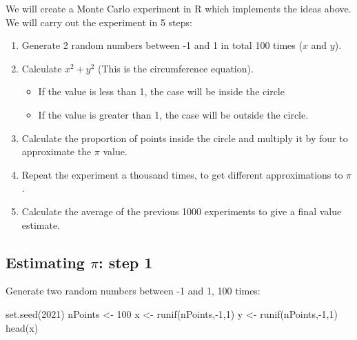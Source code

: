 \documentclass[
]{book}
\newenvironment{Shaded}{\begin{snugshade}}{\end{snugshade}}
\newcommand{\DecValTok}[1]{\textcolor[rgb]{0.00,0.00,0.81}{#1}}
\newcommand{\FunctionTok}[1]{\textcolor[rgb]{0.00,0.00,0.00}{#1}}
\newcommand{\NormalTok}[1]{#1}
\newcommand{\OtherTok}[1]{\textcolor[rgb]{0.56,0.35,0.01}{#1}}
\newcommand{\SpecialCharTok}[1]{\textcolor[rgb]{0.00,0.00,0.00}{#1}}
\providecommand{\tightlist}{%
  \setlength{\itemsep}{0pt}\setlength{\parskip}{0pt}}
\theoremstyle{definition}
\theoremstyle{definition}
\theoremstyle{definition}
\theoremstyle{definition}
\theoremstyle{remark}
\begin{document}
We will create a Monte Carlo experiment in R which implements the ideas above. We will carry out the experiment in 5 steps:

\begin{enumerate}
\def\labelenumi{\arabic{enumi}.}
\item
  Generate 2 random numbers between -1 and 1 in total 100 times (\(x\) and \(y\)).
\item
  Calculate \(x^2 + y^2\) (This is the circumference equation).

  \begin{itemize}
  \tightlist
  \item
    If the value is less than 1, the case will be inside the circle
  \item
    If the value is greater than 1, the case will be outside the circle.
  \end{itemize}
\item
  Calculate the proportion of points inside the circle and multiply it by four to approximate the \(\pi\) value.
\item
  Repeat the experiment a thousand times, to get different approximations to \(\pi\).
\item
  Calculate the average of the previous 1000 experiments to give a final value estimate.
\end{enumerate}

\hypertarget{estimating-pi-step-1}{%
\subsection{\texorpdfstring{Estimating \(\pi\): step 1}{Estimating \textbackslash pi: step 1}}\label{estimating-pi-step-1}}

Generate two random numbers between -1 and 1, 100 times:

\begin{Shaded}
\begin{Highlighting}[]
\FunctionTok{set.seed}\NormalTok{(}\DecValTok{2021}\NormalTok{)}
\NormalTok{nPoints }\OtherTok{\textless{}{-}} \DecValTok{100}
\NormalTok{x }\OtherTok{\textless{}{-}} \FunctionTok{runif}\NormalTok{(nPoints,}\SpecialCharTok{{-}}\DecValTok{1}\NormalTok{,}\DecValTok{1}\NormalTok{)}
\NormalTok{y }\OtherTok{\textless{}{-}} \FunctionTok{runif}\NormalTok{(nPoints,}\SpecialCharTok{{-}}\DecValTok{1}\NormalTok{,}\DecValTok{1}\NormalTok{)}
\FunctionTok{head}\NormalTok{(x)}
\end{Highlighting}
\end{Shaded}
\end{document}

